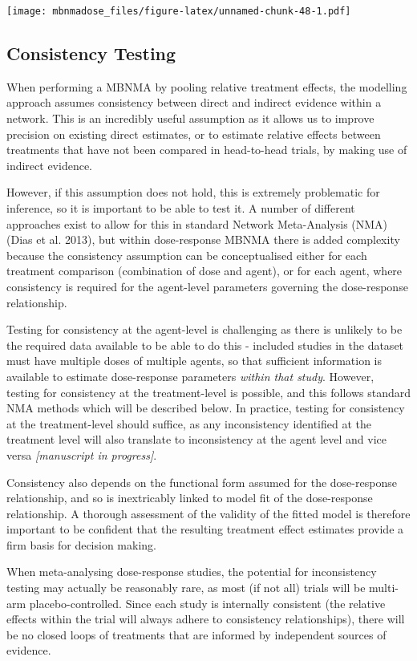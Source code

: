 \documentclass[]{article}
\begin{document}
\texttt{[image: mbnmadose\_files/figure-latex/unnamed-chunk-48-1.pdf]}

\hypertarget{consistency-testing}{%
\subsection{Consistency Testing}\label{consistency-testing}}

When performing a MBNMA by pooling relative treatment effects, the
modelling approach assumes consistency between direct and indirect
evidence within a network. This is an incredibly useful assumption as it
allows us to improve precision on existing direct estimates, or to
estimate relative effects between treatments that have not been compared
in head-to-head trials, by making use of indirect evidence.

However, if this assumption does not hold, this is extremely problematic
for inference, so it is important to be able to test it. A number of
different approaches exist to allow for this in standard Network
Meta-Analysis (NMA) (Dias et al. 2013), but within dose-response MBNMA
there is added complexity because the consistency assumption can be
conceptualised either for each treatment comparison (combination of dose
and agent), or for each agent, where consistency is required for the
agent-level parameters governing the dose-response relationship.

Testing for consistency at the agent-level is challenging as there is
unlikely to be the required data available to be able to do this -
included studies in the dataset must have multiple doses of multiple
agents, so that sufficient information is available to estimate
dose-response parameters \emph{within that study}. However, testing for
consistency at the treatment-level is possible, and this follows
standard NMA methods which will be described below. In practice, testing
for consistency at the treatment-level should suffice, as any
inconsistency identified at the treatment level will also translate to
inconsistency at the agent level and vice versa \emph{{[}manuscript in
progress{]}}.

Consistency also depends on the functional form assumed for the
dose-response relationship, and so is inextricably linked to model fit
of the dose-response relationship. A thorough assessment of the validity
of the fitted model is therefore important to be confident that the
resulting treatment effect estimates provide a firm basis for decision
making.

When meta-analysing dose-response studies, the potential for
inconsistency testing may actually be reasonably rare, as most (if not
all) trials will be multi-arm placebo-controlled. Since each study is
internally consistent (the relative effects within the trial will always
adhere to consistency relationships), there will be no closed loops of
treatments that are informed by independent sources of evidence.
\end{document}
